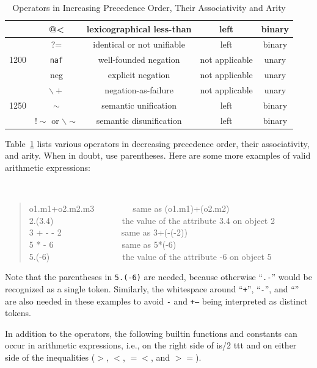 \documentclass[11pt]{article}
\newcommand{\RULELOGNAF}{{{\tt naf}}\xspace}
\begin{document}
\begin{table}[tb]
{\begin{tabular}{|c|c|c|c|c|}
            & @< & lexicographical less-than & left & binary \\ \hline
            & ?= & identical or not unifiable & left & binary \\ \hline
1200        & \RULELOGNAF & well-founded negation & not applicable & unary \\ \cline{2-5}
            & neg & explicit negation & not applicable & unary \\ \cline{2-5}
            & $\backslash+$ & negation-as-failure & not applicable & unary \\ \hline
1250        & $\sim$ & semantic unification & left & binary \\ \cline{2-5}
            & $!\sim$ or $\backslash\sim$ & semantic disunification & left & binary \\ \cline{2-5}
\hline
\end{tabular}
}
\caption{Operators in Increasing Precedence Order, Their Associativity and Arity}
\label{tab:tab-op-pre}
\end{table}

Table~\ref{tab:tab-op-pre} lists various operators in decreasing precedence
order, their associativity, and arity.  When in doubt, use parentheses.
Here are some more examples of valid arithmetic expressions:
{\tt
\begin{quote}
o1.m1+o2.m2.m3~~~~~~~~~{\rm same as} (o1.m1)+(o2.m2)\\
2.(3.4)~~~~~~~~~~~~~~~~{\rm the value of the attribute} 3.4 {\rm on object} 2\\
3 + - - 2~~~~~~~~~~~~~~{\rm same as} 3+(-(-2))\\
5 * - 6~~~~~~~~~~~~~~~~{\rm same as} 5*(-6)\\
5.(-6)~~~~~~~~~~~~~~~~~{\rm the value of the attribute} -6 {\rm on object} 5
\end{quote}
}
Note that the parentheses in {\tt 5.(-6)} are needed,
because otherwise ``{\tt .-}'' would be recognized as a single token.
Similarly, the whitespace around ``{\tt +}'', ``{\tt -}'', and ``{\tt *}''
are also needed in these examples to avoid {\tt *-} and {\tt +--} being
interpreted as distinct tokens.

In addition to the operators, the following builtin functions and constants
can occur in arithmetic expressions, i.e., on the right side of is/2
ttt and on either side of the inequalities ($>$, $<$, $=<$, and $>=$).
\end{document}
